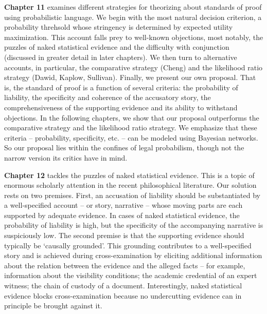 \documentclass[10pt,dvipsnames,enabledeprecatedfontcommands]{scrartcl}
\begin{document}
\textbf{Chapter 11} examines different strategies for theorizing about
standards of proof using probabilistic language. We begin with the most
natural decision criterion, a probability threhsold whose stringency is
determined by expected utility maximization. This account falls prey to
well-known objections, most notably, the puzzles of naked statistical
evidence and the difficulty with conjunction (discussed in greater
detail in later chapters). We then turn to alternative accounts, in
particular, the comparative strategy (Cheng) and the likelihood ratio
strategy (Dawid, Kaplow, Sullivan). Finally, we present our own
proposal. That is, the standard of proof is a function of several
criteria: the probability of liability, the specificity and coherence of
the accusatory story, the comprehensiveness of the supporting evidence
and its ability to withstand objections. In the following chapters, we
show that our proposal outperforms the comparative strategy and the
likelihood ratio strategy. We emphasize that these criteria --
probability, specificity, etc. -- can be modeled using Bayesian
networks. So our proposal lies within the confines of legal probabilism,
though not the narrow version its critics have in mind.

\textbf{Chapter 12} tackles the puzzles of naked statistical evidence.
This is a topic of enormous scholarly attention in the recent
philosophical literature. Our solution rests on two premises. First, an
accusation of liability should be substantiated by a well-specified
account -- or story, narrative -- whose moving parts are each supported
by adequate evidence. In cases of naked statistical evidence, the
probability of liability is high, but the specificity of the
accompanying narrative is suspiciously low. The second premise is that
the supporting evidence should typically be `causally grounded'. This
grounding contributes to a well-specified story and is achieved during
cross-examination by eliciting additional information about the relation
between the evidence and the alleged facts -- for example, information
about the visibility conditions; the academic credential of an expert
witness; the chain of custody of a document. Interestingly, naked
statistical evidence blocks cross-examination because no undercutting
evidence can in principle be brought against it.
\end{document}
